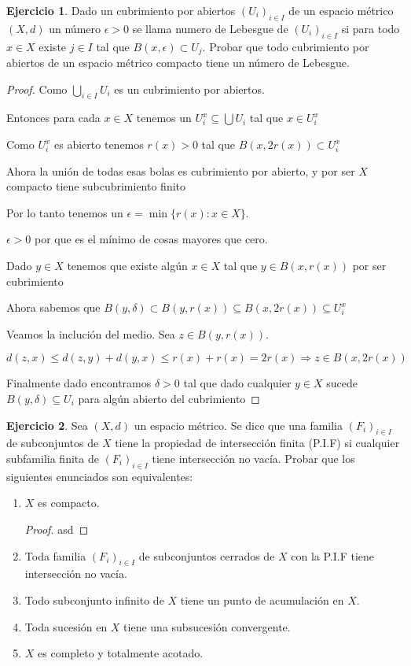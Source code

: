 \documentclass[11pt]{report}
\newcommand{\Ra}{\Rightarrow}
\theoremstyle{definition}
\newtheorem{ej}{Ejercicio}
\begin{document}
	\begin{ej}
		Dado un cubrimiento por abiertos $(U_i)_{i \in I}$ de un espacio métrico $(X,d)$ un número $\epsilon >0$ se llama numero de Lebesgue de $(U_i)_{i \in I}$ si para todo $x \in X$ existe $j \in I$ tal que $B(x,\epsilon) \subset U_j$. Probar que todo cubrimiento por abiertos de un espacio métrico compacto tiene un número de Lebesgue.
		\begin{proof}
			Como $\bigcup_{i \in I} U_i$ es un cubrimiento por abiertos.

			Entonces para cada $x\in X$ tenemos un $U_i^x \subseteq \bigcup U_i$ tal que $x \in U_i^x $

			Como $U_i^x$ es abierto tenemos $r(x) >0$ tal que $B(x,2r(x)) \subset U_i^x$

			Ahora la unión de todas esas bolas es cubrimiento por abierto, y por ser $X$ compacto tiene subcubrimiento finito

			Por lo tanto tenemos un $\epsilon = \min \{r(x) : x\in X\}$.

			$\epsilon > 0 $ por que es el mínimo de cosas mayores que cero.

			Dado $y \in X$ tenemos que existe algún $x \in X$ tal que $y \in B(x,r(x)) $ por ser cubrimiento

			Ahora sabemos que $B(y,\delta) \subset B(y,r(x)) \subseteq B(x,2r(x)) \subseteq U_i^x$

			Veamos la inclución del medio. Sea $z \in B(y,r(x))$. 

			$$ d(z,x) \leq d(z,y)  + d(y,x) \leq r(x) + r(x) = 2r(x) \Ra z \in B(x,2r(x))$$

			Finalmente dado encontramos $\delta >0$ tal que dado cualquier $y \in X$ sucede $B(y,\delta) \subseteq U_i$ para algún abierto del cubrimiento

		\end{proof}
	\end{ej}
	
	\begin{ej}
		Sea $(X,d)$ un espacio métrico. Se dice que una familia $(F_i)_{i\in I}$ de subconjuntos de $X$ tiene la propiedad de intersección finita (P.I.F) si cualquier subfamilia finita de $(F_i)_{i \in I}$ tiene intersección no vacía.
		Probar que los siguientes enunciados son equivalentes:
		\begin{enumerate}
			\item $X$ es compacto.
				\begin{proof}
					asd
				\end{proof}
			\item Toda familia $(F_i)_{i \in I}$ de subconjuntos cerrados de $X$ con la P.I.F tiene intersección no vacía.
			\item Todo subconjunto infinito de $X$ tiene un punto de acumulación en $X$.
			\item Toda sucesión en $X$ tiene una subsucesión convergente.
			\item $X$ es completo y totalmente acotado.
		\end{enumerate}
	\end{ej}
	
\end{document}
